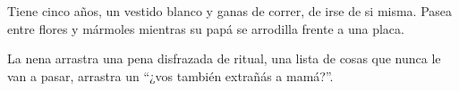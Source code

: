 
Tiene cinco años, un vestido blanco y ganas de correr, de irse de si misma.
Pasea entre flores y mármoles mientras su papá se arrodilla frente a una placa.

La nena arrastra una pena disfrazada de ritual, una lista de cosas que nunca le
van a pasar, arrastra un ``¿vos también extrañás a mamá?''.

